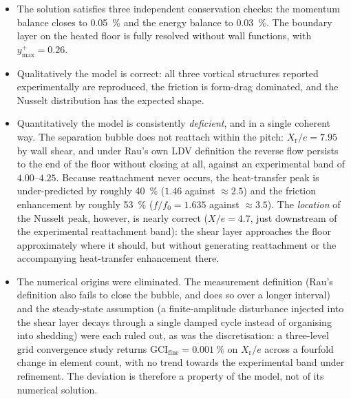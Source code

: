 \documentclass[11pt,a4paper]{article}
\newcommand{\Xr}{X_{\mathrm{r}}}
\begin{document}
\begin{itemize}
  \item The solution satisfies three independent conservation checks: the
  momentum balance closes to \SI{0.05}{\percent} and the energy balance to
  \SI{0.03}{\percent}. The boundary layer on the heated floor is fully
  resolved without wall functions, with $y^{+}_{\max} = 0.26$.

  \item Qualitatively the model is correct: all three vortical structures
  reported experimentally are reproduced, the friction is form-drag
  dominated, and the Nusselt distribution has the expected shape.

  \item Quantitatively the model is consistently \emph{deficient}, and in a
  single coherent way. The separation bubble does not reattach within the
  pitch: $\Xr/e = 7.95$ by wall shear, and under Rau's own LDV definition
  the reverse flow persists to the end of the floor without closing at all,
  against an experimental band of $4.00$--$4.25$. Because reattachment never
  occurs, the heat-transfer peak is under-predicted by roughly
  \SI{40}{\percent} ($1.46$ against $\approx 2.5$) and the friction
  enhancement by roughly \SI{53}{\percent} ($f/f_{0} = 1.635$ against
  $\approx 3.5$). The \emph{location} of the Nusselt peak, however, is
  nearly correct ($X/e = 4.7$, just downstream of the experimental
  reattachment band): the shear layer approaches the floor approximately
  where it should, but without generating reattachment or the accompanying
  heat-transfer enhancement there.

  \item The numerical origins were eliminated. The measurement definition
  (Rau's definition also fails to close the bubble, and does so over a
  longer interval) and the steady-state assumption (a finite-amplitude
  disturbance injected into the shear layer decays through a single damped
  cycle instead of organising into shedding) were each ruled out, as was the
  discretisation: a three-level grid convergence study returns
  GCI$_{\text{fine}} = \SI{0.001}{\percent}$ on $\Xr/e$ across a fourfold
  change in element count, with no trend towards the experimental band under
  refinement. The deviation is therefore a property of the model, not of its
  numerical solution.


\end{itemize}
\end{document}
